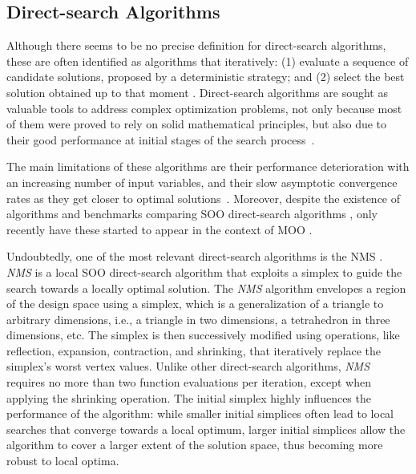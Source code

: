 	\subsection{Direct-search Algorithms}
	\label{ssec:direct-search}
	
	Although there seems to be no precise definition for direct-search algorithms, these are often identified as algorithms that iteratively: (1) evaluate a sequence of candidate solutions, proposed by a deterministic strategy; and (2) select the best solution obtained up to that moment \cite{Conn2009}. Direct-search algorithms are sought as valuable tools to address complex optimization problems, not only because most of them were proved to rely on solid mathematical principles, but also due to their good performance at initial stages of the search process~\cite{Rios2013}. 
	
	The main limitations of these algorithms are their performance deterioration with an increasing number of input variables, and their slow asymptotic convergence rates as they get closer to optimal solutions~\cite{Kolda2003}. Moreover, despite the existence of algorithms and benchmarks comparing SOO direct-search algorithms \cite{Waibel2018}, only recently have these started to appear in the context of MOO \cite{Custodio2010,Custodio2018}. 
	
	Undoubtedly, one of the most relevant direct-search algorithms is the NMS \cite{Nelder1964}. \textit{\ac{NMS}} is a local \ac{SOO} direct-search algorithm that exploits a simplex to guide the search towards a locally optimal solution. The \textit{\ac{NMS}} algorithm envelopes a region of the design space using a simplex, which is a generalization of a triangle to arbitrary dimensions, i.e., a triangle in two dimensions, a tetrahedron in three dimensions, etc. The simplex is then successively modified using operations, like reflection, expansion, contraction, and shrinking, that iteratively replace the simplex's worst vertex values. %
	Unlike other direct-search algorithms, \textit{\ac{NMS}} requires no more than two function evaluations per iteration, except when applying the shrinking operation. The initial simplex highly influences the performance of the algorithm: while smaller initial simplices often lead to local searches that converge towards a local optimum, larger initial simplices allow the algorithm to cover a larger extent of the solution space, thus becoming more robust to local optima.
	
